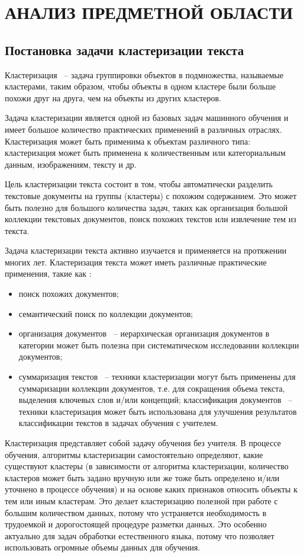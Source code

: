 \chapter{АНАЛИЗ ПРЕДМЕТНОЙ ОБЛАСТИ}
\label{chap:analysis}
\aftertitle

\section{Постановка задачи кластеризации текста}


Кластеризация ~-- задача группировки объектов в подмножества, называемые кластерами, таким образом, чтобы объекты в одном кластере были больше похожи друг на друга, чем на объекты из других кластеров.

Задача кластеризации является одной из базовых задач машинного обучения и имеет большое количество практических применений в различных отраслях. Кластеризация может быть применима к объектам различного типа: кластеризация может быть применена к количественным или категориальным данным, изображениям, тексту и др.

Цель кластеризации текста состоит в том, чтобы автоматически разделить текстовые документы на группы (кластеры) с похожим содержанием. Это может быть полезно для большого количества задач, таких как организация большой коллекции текстовых документов, поиск похожих текстов или извлечение тем из текста.

Задача кластеризации текста активно изучается и применяется на протяжении многих лет. Кластеризация текста может иметь различные практические применения, такие как \cite{text-clustering-survey}:
\begin{itemize}
    \item поиск похожих документов;
    \item семантический поиск по коллекции документов;
    \item организация документов ~-- иерархическая организация документов в категории может быть полезна при систематическом исследовании коллекции документов;
    \item суммаризация текстов ~-- техники кластеризации могут быть применены для суммаризации коллекции документов, т.е. для сокращения объема текста, выделения ключевых слов и/или концепций;
     классификация документов ~-- техники кластеризация может быть использована для улучшения результатов классификации текстов в задачах обучения с учителем.
\end{itemize}

Кластеризация представляет собой задачу обучения без учителя. В процессе обучения, алгоритмы кластеризации самостоятельно определяют, какие существуют кластеры (в зависимости от алгоритма кластеризации, количество кластеров может быть задано вручную или же тоже быть определено и/или уточнено в процессе обучения) и на основе каких признаков относить объекты к тем или иным кластерам. Это делает кластеризацию полезной при работе с большим количеством данных, потому что устраняется необходимость в трудоемкой и дорогостоящей процедуре разметки данных. Это особенно актуально для задач обработки естественного языка, потому что позволяет использовать огромные объемы данных для обучения.


